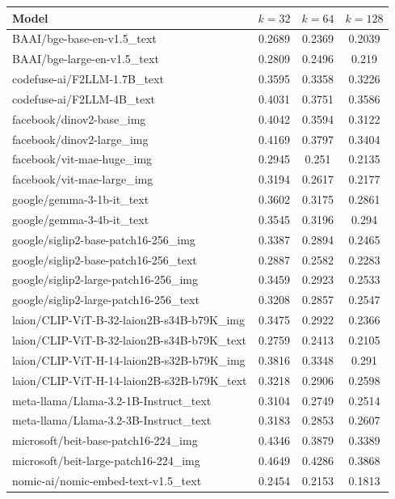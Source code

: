 \begin{table}[ht]
\centering
\begin{tabular}{lccc}
\hline
Model & $k=32$ & $k=64$ & $k=128$ \\
\hline
BAAI/bge-base-en-v1.5\_text & 0.2689 & 0.2369 & 0.2039 \\
BAAI/bge-large-en-v1.5\_text & 0.2809 & 0.2496 & 0.219 \\
codefuse-ai/F2LLM-1.7B\_text & 0.3595 & 0.3358 & 0.3226 \\
codefuse-ai/F2LLM-4B\_text & 0.4031 & 0.3751 & 0.3586 \\
facebook/dinov2-base\_img & 0.4042 & 0.3594 & 0.3122 \\
facebook/dinov2-large\_img & 0.4169 & 0.3797 & 0.3404 \\
facebook/vit-mae-huge\_img & 0.2945 & 0.251 & 0.2135 \\
facebook/vit-mae-large\_img & 0.3194 & 0.2617 & 0.2177 \\
google/gemma-3-1b-it\_text & 0.3602 & 0.3175 & 0.2861 \\
google/gemma-3-4b-it\_text & 0.3545 & 0.3196 & 0.294 \\
google/siglip2-base-patch16-256\_img & 0.3387 & 0.2894 & 0.2465 \\
google/siglip2-base-patch16-256\_text & 0.2887 & 0.2582 & 0.2283 \\
google/siglip2-large-patch16-256\_img & 0.3459 & 0.2923 & 0.2533 \\
google/siglip2-large-patch16-256\_text & 0.3208 & 0.2857 & 0.2547 \\
laion/CLIP-ViT-B-32-laion2B-s34B-b79K\_img & 0.3475 & 0.2922 & 0.2366 \\
laion/CLIP-ViT-B-32-laion2B-s34B-b79K\_text & 0.2759 & 0.2413 & 0.2105 \\
laion/CLIP-ViT-H-14-laion2B-s32B-b79K\_img & 0.3816 & 0.3348 & 0.291 \\
laion/CLIP-ViT-H-14-laion2B-s32B-b79K\_text & 0.3218 & 0.2906 & 0.2598 \\
meta-llama/Llama-3.2-1B-Instruct\_text & 0.3104 & 0.2749 & 0.2514 \\
meta-llama/Llama-3.2-3B-Instruct\_text & 0.3183 & 0.2853 & 0.2607 \\
microsoft/beit-base-patch16-224\_img & 0.4346 & 0.3879 & 0.3389 \\
microsoft/beit-large-patch16-224\_img & 0.4649 & 0.4286 & 0.3868 \\
nomic-ai/nomic-embed-text-v1.5\_text & 0.2454 & 0.2153 & 0.1813 \\

\end{tabular}
\end{table}
